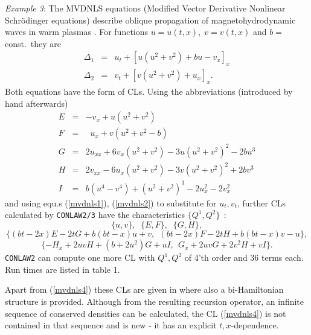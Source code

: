 {\it Example 3}: \newline
The MVDNLS equations (Modified Vector Derivative Nonlinear Schr\"{o}dinger
equations) describe oblique propagation of magnetohydrodynamic waves in
warm plasmas \cite{NS}. For
functions $u = u(t,x), \; v = v(t,x)$ and $b = $ const.\ they are
\begin{eqnarray}
\Delta_1 & = & u_t + [u(u^2+v^2) + bu - v_x]_x \label{mvdnls1} \\
\Delta_2 & = & v_t + [v(u^2+v^2) + u_x]_x.      \label{mvdnls2}
\end{eqnarray}
Both equations have the form of CLs. Using the abbreviations (introduced
by hand afterwards)
\begin{eqnarray*}
E & = &   - v_x+u(u^2+v^2  ) \\
F & = & \;\;u_x+v(u^2+v^2-b) \\
G & = & 2u_{xx}+6v_x(u^2+v^2)-3u(u^2+v^2)^2-2bu^3 \\
H & = & 2v_{xx}-6u_x(u^2+v^2)-3v(u^2+v^2)^2+2bv^3 \\
I & = & b(u^4-v^4)+(u^2+v^2)^3-2u_x^2-2v_x^2
\end{eqnarray*}
and using equ.s (\ref{mvdnls1}), (\ref{mvdnls2}) to substitute
for $u_t, v_t$,
further CLs calculated by {\tt CONLAW2/3} have the characteristics
$\{Q^1,Q^2\}\;\,$:
\begin{equation} \{u, v\},\;\; \{E, F\},\;\; \{G, H\}, \label{mvdnls3}
\end{equation}
\vspace{-5mm}
\begin{equation} \{(bt-2x)E-2tG+b(bt-x)u+v,\;\, (bt-2x)F-2tH+b(bt-x)v-u\},
\label{mvdnls4} \end{equation}
\vspace{-3mm}
\begin{equation}
\{-H_x+2uvH+(b+2u^2)G+uI,\;\, G_x+2uvG+2v^2H+vI \}.
\label{mvdnls5} \end{equation}
{\tt CONLAW2} can compute one more CL with $Q^1, Q^2$ of 4'th order
and 36 terms each. Run times are listed in table 1.

Apart from (\ref{mvdnls4}) these CLs are given in \cite{NS}
where also a bi-Hamiltonian structure is provided.
Although from the resulting recursion operator, an infinite sequence
of conserved densities can be calculated, the CL (\ref{mvdnls4}) is not
contained in that sequence and is new - it has an explicit
$t,x$-dependence.

